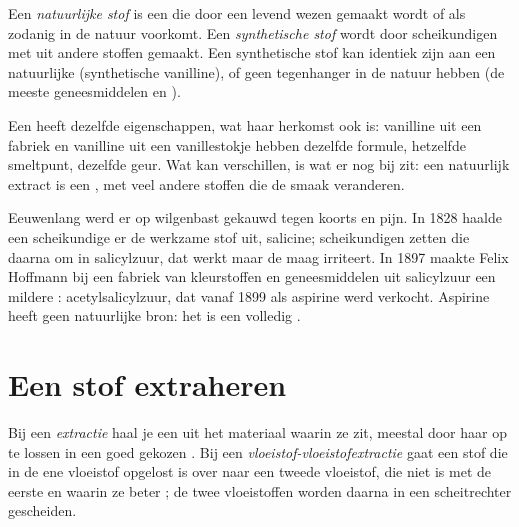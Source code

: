 \begin{definition}\label{def:g10:chemical-species:natural}
Een \emph{natuurlijke stof} is een  die door een levend wezen gemaakt wordt of als zodanig in de natuur
voorkomt. Een \emph{synthetische stof} wordt
door scheikundigen met  uit andere stoffen gemaakt.
Een synthetische stof kan identiek zijn aan een natuurlijke
(synthetische vanilline), of geen tegenhanger in de natuur hebben (de
meeste geneesmiddelen en ).
\end{definition}

\begin{proposition}\label{prop:g10:chemical-species:same}
Een  heeft dezelfde eigenschappen, wat haar herkomst ook
is: vanilline uit een fabriek en vanilline uit een vanillestokje hebben
dezelfde formule, hetzelfde smeltpunt, dezelfde geur. Wat kan
verschillen, is wat er nog bij zit: een natuurlijk extract is een
, met veel andere stoffen die de smaak veranderen.
\end{proposition}

\begin{history}
Eeuwenlang werd er op wilgenbast gekauwd tegen koorts en pijn. In 1828
haalde een scheikundige er de werkzame stof uit, salicine; scheikundigen
zetten die daarna om in salicylzuur, dat werkt maar de maag irriteert.
In 1897 maakte Felix Hoffmann bij een fabriek van kleurstoffen en
geneesmiddelen uit salicylzuur een mildere :
acetylsalicylzuur, dat vanaf 1899 als aspirine werd verkocht. Aspirine
heeft geen natuurlijke bron: het is een volledig .
\end{history}

\section{Een stof extraheren}

\begin{definition}\label{def:g10:chemical-species:extraction}
Bij een \emph{extractie} haal je een  uit
het materiaal waarin ze zit, meestal door haar op te lossen in een goed
gekozen . Bij een
\emph{vloeistof-vloeistofextractie}
gaat een stof die in de ene vloeistof opgelost is over naar een tweede
vloeistof, die niet  is met de eerste en waarin ze beter
; de twee vloeistoffen worden daarna in een scheitrechter
gescheiden.
\end{definition}


